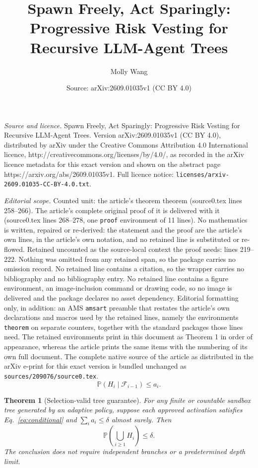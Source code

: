 \documentclass[10pt,a4paper]{amsart}
\title{Spawn Freely, Act Sparingly: Progressive Risk Vesting for Recursive LLM-Agent Trees}
\author{Molly Wang}
\date{Source: arXiv:2609.01035v1 (CC BY 4.0)}
\newtheorem{theorem}{Theorem}
\newcommand{\F}{\mathcal{F}}
\newcommand{\Prb}{\mathbb{P}}
\begin{document}
\maketitle

\noindent\emph{Source and licence.} Spawn Freely, Act Sparingly: Progressive Risk Vesting for Recursive LLM-Agent Trees. Version arXiv:2609.01035v1 (CC BY 4.0), distributed by arXiv under the Creative Commons Attribution 4.0 International licence, http://creativecommons.org/licenses/by/4.0/, as recorded in the arXiv licence metadata for this exact version and shown on the abstract page https://arxiv.org/abs/2609.01035v1. Full licence notice: \texttt{licenses/arxiv-2609.01035-CC-BY-4.0.txt}.\par\smallskip

\noindent\textit{Editorial scope.} Counted unit: the article's theorem theorem (source0.tex lines 258--266). The article's complete original proof of it is delivered with it (source0.tex lines 268--278, one \texttt{proof} environment of 11 lines). No mathematics is written, repaired or re-derived: the statement and the proof are the article's own lines, in the article's own notation, and no retained line is substituted or re-flowed.  Retained uncounted as the source-local context the proof needs: lines 219--222.  Nothing was omitted from any retained span, so the package carries no omission record.  No retained line contains a citation, so the wrapper carries no bibliography and no bibliography entry.  No retained line contains a figure environment, an image-inclusion command or drawing code, so no image is delivered and the package declares no asset dependency.  Editorial formatting only, in addition: an AMS \texttt{amsart} preamble that restates the article's own declarations and macros used by the retained lines, namely the environments \texttt{theorem} on separate counters, together with the standard packages those lines need.  The retained environments print in this document as Theorem 1 in order of appearance, whereas the article prints the same items with the numbering of its own full document.  The complete native source of the article as distributed in the arXiv e-print for this exact version is bundled unchanged as \texttt{sources/209076/source0.tex}.
\begin{equation}
 \Prb(H_i\mid \F_{i-1})\leq a_i .
 \label{eq:conditional}
\end{equation}

\begin{theorem}[Selection-valid tree guarantee]
For any finite or countable sandbox tree generated by an adaptive policy, suppose each approved
activation satisfies Eq.~\eqref{eq:conditional} and
$\sum_i a_i\leq\delta$ almost surely.  Then
\[
 \Prb\!\left(\bigcup_{i\geq1}H_i\right)\leq\delta .
\]
The conclusion does not require independent branches or a predetermined depth limit.
\end{theorem}
\end{document}
